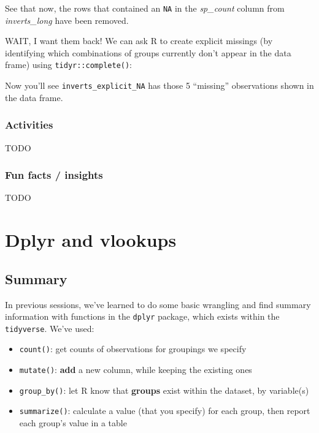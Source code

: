 \documentclass[]{book}
\newenvironment{Shaded}{\begin{snugshade}}{\end{snugshade}}
\newcommand{\KeywordTok}[1]{\textcolor[rgb]{0.13,0.29,0.53}{\textbf{#1}}}
\newcommand{\NormalTok}[1]{#1}
\newcommand{\OperatorTok}[1]{\textcolor[rgb]{0.81,0.36,0.00}{\textbf{#1}}}
\newcommand{\StringTok}[1]{\textcolor[rgb]{0.31,0.60,0.02}{#1}}
\providecommand{\tightlist}{%
  \setlength{\itemsep}{0pt}\setlength{\parskip}{0pt}}
\begin{document}
See that now, the rows that contained an \texttt{NA} in the \emph{sp\_count} column from \emph{inverts\_long} have been removed.

WAIT, I want them back! We can ask R to create explicit missings (by identifying which combinations of groups currently don't appear in the data frame) using \texttt{tidyr::complete()}:

\begin{Shaded}
\end{Shaded}

Now you'll see \texttt{inverts\_explicit\_NA} has those 5 ``missing'' observations shown in the data frame.

\hypertarget{activities}{%
\subsection{Activities}\label{activities}}

TODO

\hypertarget{fun-facts-insights}{%
\subsection{Fun facts / insights}\label{fun-facts-insights}}

TODO

\hypertarget{vlookup}{%
\chapter{Dplyr and vlookups}\label{vlookup}}

\hypertarget{summary-6}{%
\section{Summary}\label{summary-6}}

In previous sessions, we've learned to do some basic wrangling and find summary information with functions in the \texttt{dplyr} package, which exists within the \texttt{tidyverse}. We've used:

\begin{itemize}
\tightlist
\item
  \texttt{count()}: get counts of observations for groupings we specify
\item
  \texttt{mutate()}: \textbf{add} a new column, while keeping the existing ones
\item
  \texttt{group\_by()}: let R know that \textbf{groups} exist within the dataset, by variable(s)
\item
  \texttt{summarize()}: calculate a value (that you specify) for each group, then report each group's value in a table
\end{itemize}
\end{document}

